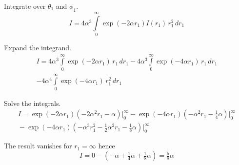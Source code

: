 \documentclass[12pt]{article}
\begin{document}
Integrate over $\theta_1$ and $\phi_1$.
\begin{equation*}
I=4\alpha^3\int\limits_0^\infty
\exp(-2\alpha r_1)I(r_1)\,r_1^2\,dr_1
\end{equation*}

Expand the integrand.
\begin{multline*}
I=4\alpha^3\int\limits_0^\infty\exp(-2\alpha r_1)\,r_1\,dr_1
-4\alpha^3\int\limits_0^\infty\exp(-4\alpha r_1)\,r_1\,dr_1
\\
-4\alpha^4\int\limits_0^\infty\exp(-4\alpha r_1)\,r_1^2\,dr_1
\end{multline*}

Solve the integrals.
\begin{multline*}
I=\exp(-2\alpha r_1)\left(-2\alpha^2r_1-\alpha\right)\bigg|_0^\infty
-\exp(-4\alpha r_1)\left(-\alpha^2r_1-\tfrac{1}{4}\alpha\right)\bigg|_0^\infty
\\
{}-\exp(-4\alpha r_1)\left(-\alpha^3r_1^2-\tfrac{1}{2}\alpha^2r_1-\tfrac{1}{8}\alpha\right)\bigg|_0^\infty
\end{multline*}

The result vanishes for $r_1=\infty$ hence
\begin{equation*}
I=0-\left(-\alpha+\tfrac{1}{4}\alpha+\tfrac{1}{8}\alpha\right)=\tfrac{5}{8}\alpha
\tag{7}
\end{equation*}
\end{document}
